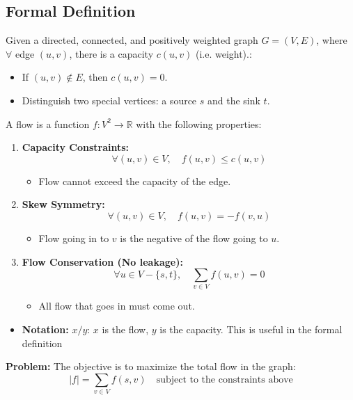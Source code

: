 \subsection{Formal Definition}
\begin{definition}
    Given a directed, connected, and positively weighted graph $G=(V,E)$, where $\forall$ edge $(u, v)$, there is a capacity $c(u, v)$ (i.e. weight).:
    \begin{itemize}
        \item If $(u, v) \notin E$, then $c(u, v) = 0$.
        \item Distinguish two special vertices: a source $s$ and the sink $t$.
    \end{itemize}
    \vspace{1em}

    A flow is a function $f: V^2 \to \mathbb{R}$ with the following properties:
    \begin{enumerate}
        \item \textbf{Capacity Constraints:} 
        \[
        \forall (u, v) \in V, \quad f(u, v) \leq c(u, v)
        \]
        \begin{itemize}
            \item Flow cannot exceed the capacity of the edge. 
        \end{itemize}
        \item \textbf{Skew Symmetry:}
        \[
        \forall (u, v) \in V, \quad f(u, v) = -f(v, u)
        \]
        \begin{itemize}
            \item Flow going in to $v$ is the negative of the flow going to $u$.
        \end{itemize}
        \item \textbf{Flow Conservation (No leakage):}
        \[
        \forall u \in V - \{s, t\}, \quad \sum_{v \in V} f(u, v) = 0
        \]
        \begin{itemize}
            \item All flow that goes in must come out.
        \end{itemize}
    \end{enumerate}
    \begin{itemize}
        \item \textbf{Notation:} $x/y$: $x$ is the flow, $y$ is the capacity. This is useful in the formal definition
    \end{itemize}
    \vspace{1em}

    \textbf{Problem:} The objective is to maximize the total flow in the graph:
    \[
    |f| = \sum_{v \in V} f(s, v) \quad \text{subject to the constraints above}
    \]
\end{definition}

